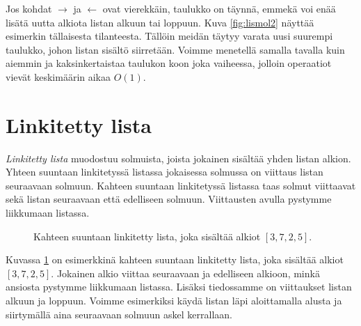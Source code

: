 Jos kohdat $\rightarrow$ ja $\leftarrow$ ovat vierekkäin,
taulukko on täynnä, emmekä voi enää lisätä uutta alkiota
listan alkuun tai loppuun.
Kuva \ref{fig:lismol2} näyttää esimerkin tällaisesta tilanteesta.
Tällöin meidän täytyy varata uusi suurempi taulukko,
johon listan sisältö siirretään.
Voimme menetellä samalla tavalla kuin aiemmin ja
kaksinkertaistaa taulukon koon joka vaiheessa,
jolloin operaatiot vievät keskimäärin aikaa $O(1)$.

\section{Linkitetty lista}

\emph{Linkitetty lista} muodostuu solmuista, joista jokainen sisältää
yhden listan alkion.
Yhteen suuntaan linkitetyssä listassa jokaisessa
solmussa on viittaus listan seuraavaan solmuun.
Kahteen suuntaan linkitetyssä listassa taas
solmut viittaavat sekä listan seuraavaan että edelliseen solmuun.
Viittausten avulla pystymme liikkumaan listassa.

\begin{figure}
\center
{}
\caption{Kahteen suuntaan linkitetty lista, joka sisältää alkiot $[3,7,2,5]$.}
\label{fig:linlis}
\end{figure}

Kuvassa \ref{fig:linlis} on esimerkkinä kahteen suuntaan linkitetty lista,
joka sisältää alkiot $[3,7,2,5]$.
Jokainen alkio viittaa seuraavaan ja edelliseen alkioon,
minkä ansiosta pystymme liikkumaan listassa.
Lisäksi tiedossamme on viittaukset listan alkuun ja loppuun.
Voimme esimerkiksi käydä listan läpi aloittamalla alusta
ja siirtymällä aina seuraavaan solmuun askel kerrallaan.

